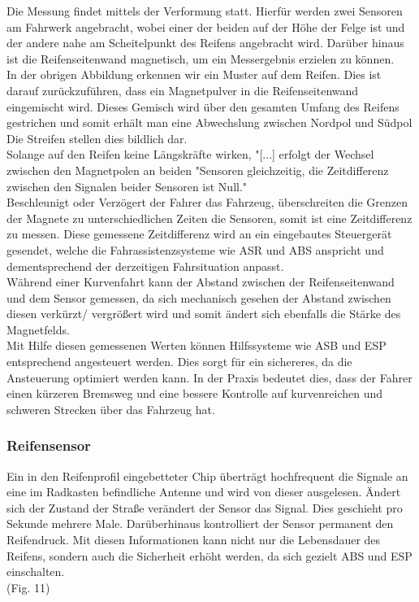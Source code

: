 				Die Messung findet mittels der Verformung statt. Hierfür werden zwei Sensoren am Fahrwerk angebracht, wobei einer der beiden auf der Höhe der Felge ist und der andere nahe am Scheitelpunkt des Reifens angebracht wird. Darüber hinaus ist die Reifenseitenwand magnetisch, um ein Messergebnis erzielen zu können.\\
				In der obrigen Abbildung erkennen wir ein Muster auf dem Reifen. Dies ist darauf zurückzuführen, dass ein Magnetpulver in die Reifenseitenwand eingemischt wird. Dieses Gemisch wird über den gesamten Umfang des Reifens gestrichen und somit erhält man eine Abwechslung zwischen Nordpol und Südpol Die Streifen stellen dies bildlich dar.\\
				Solange auf den Reifen keine Längskräfte wirken, "[...] erfolgt der Wechsel zwischen den Magnetpolen an beiden "Sensoren gleichzeitig, die Zeitdifferenz zwischen den Signalen beider Sensoren ist Null."\cite{TS_swt} \\
				Beschleunigt oder Verzögert der Fahrer das Fahrzeug, überschreiten die Grenzen der Magnete zu unterschiedlichen Zeiten die Sensoren, somit ist eine Zeitdifferenz zu messen. Diese gemessene Zeitdifferenz wird an ein eingebautes Steuergerät gesendet, welche die Fahrassistenzsysteme wie ASR und ABS anspricht und dementsprechend der derzeitigen Fahrsituation anpasst.\\
				Während einer Kurvenfahrt kann der Abstand zwischen der Reifenseitenwand und dem Sensor gemessen, da sich mechanisch gesehen der Abstand zwischen diesen verkürzt/ vergrößert wird und somit ändert sich ebenfalls die Stärke des Magnetfelds.\\
				Mit Hilfe diesen gemessenen Werten können Hilfssysteme wie ASB und ESP entsprechend angesteuert werden. Dies sorgt für ein sichereres, da die Ansteuerung optimiert werden kann. In der Praxis bedeutet dies, dass der Fahrer einen kürzeren Bremsweg und eine bessere Kontrolle auf kurvenreichen und schweren Strecken über das Fahrzeug hat.
				
			\subsubsection{Reifensensor}
				Ein in den Reifenprofil eingebetteter Chip überträgt hochfrequent die Signale an eine im Radkasten befindliche Antenne und wird von dieser ausgelesen. Ändert sich der Zustand der Straße verändert der Sensor das Signal. Dies geschieht pro Sekunde mehrere Male. Darüberhinaus kontrolliert der Sensor permanent den Reifendruck. Mit diesen Informationen kann nicht nur die Lebensdauer des Reifens, sondern auch die Sicherheit erhöht werden, da sich gezielt ABS und ESP einschalten.\\(Fig. 11)
				
